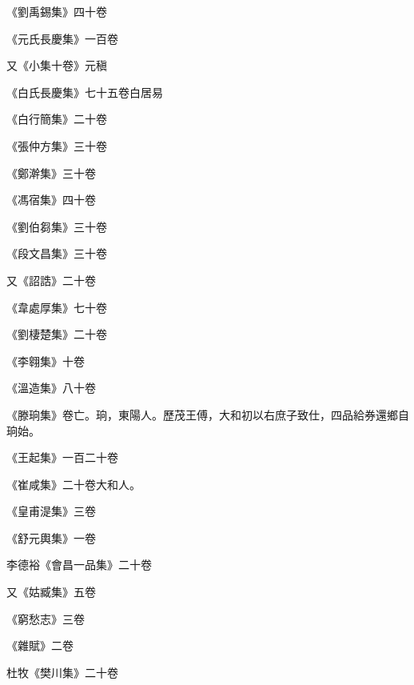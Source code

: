 \begin{pinyinscope}
 《劉禹錫集》四十卷



 《元氏長慶集》一百卷



 又《小集十卷》元稹



 《白氏長慶集》七十五卷白居易



 《白行簡集》二十卷



 《張仲方集》三十卷



 《鄭澣集》三十卷



 《馮宿集》四十卷



 《劉伯芻集》三十卷



 《段文昌集》三十卷



 又《詔誥》二十卷



 《韋處厚集》七十卷



 《劉棲楚集》二十卷



 《李翱集》十卷



 《溫造集》八十卷



 《滕珦集》卷亡。珦，東陽人。歷茂王傅，大和初以右庶子致仕，四品給券還鄉自珦始。



 《王起集》一百二十卷



 《崔咸集》二十卷大和人。



 《皇甫湜集》三卷



 《舒元輿集》一卷



 李德裕《會昌一品集》二十卷



 又《姑臧集》五卷



 《窮愁志》三卷



 《雜賦》二卷



 杜牧《樊川集》二十卷




\end{pinyinscope}
